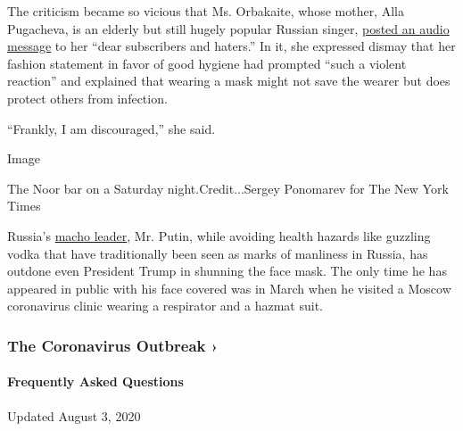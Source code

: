 The criticism became so vicious that Ms. Orbakaite, whose mother, Alla
Pugacheva, is an elderly but still hugely popular Russian singer,
\href{https://www.instagram.com/tv/CCHJPXkpV72/?utm_source=ig_embed}{posted
an audio message} to her ``dear subscribers and haters.'' In it, she
expressed dismay that her fashion statement in favor of good hygiene had
prompted ``such a violent reaction'' and explained that wearing a mask
might not save the wearer but does protect others from infection.

``Frankly, I am discouraged,'' she said.

Image

The Noor bar on a Saturday night.Credit...Sergey Ponomarev for The New
York Times

Russia's
\href{https://www.nytimes3xbfgragh.onion/2017/08/05/world/europe/vladimir-putin-russia-summer-vacation.html}{macho
leader}, Mr. Putin, while avoiding health hazards like guzzling vodka
that have traditionally been seen as marks of manliness in Russia, has
outdone even President Trump in shunning the face mask. The only time he
has appeared in public with his face covered was in March when he
visited a Moscow coronavirus clinic wearing a respirator and a hazmat
suit.

\href{https://www.nytimes3xbfgragh.onion/news-event/coronavirus?action=click\&pgtype=Article\&state=default\&region=MAIN_CONTENT_3\&context=storylines_faq}{}

\hypertarget{the-coronavirus-outbreak-}{%
\subsubsection{The Coronavirus Outbreak
›}\label{the-coronavirus-outbreak-}}

\hypertarget{frequently-asked-questions}{%
\paragraph{Frequently Asked
Questions}\label{frequently-asked-questions}}

Updated August 3, 2020

